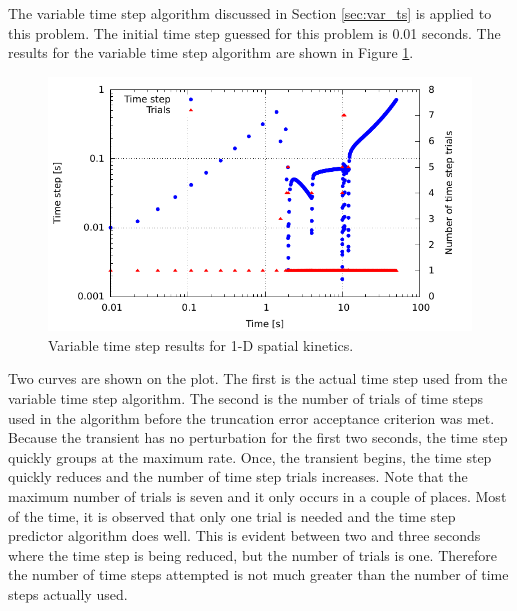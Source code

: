 \documentclass{ansconf}
\numberwithin{equation}{section}
\begin{document}
The variable time step algorithm discussed in Section \ref{sec:var_ts} is applied to this problem. The initial time step guessed for this problem is 0.01 seconds. The results for the variable time step algorithm are shown in Figure \ref{fig:1D_time}. 
\begin{figure}
\centering \includegraphics[scale=1.00]{./figs/1D_time.pdf}
\caption{Variable time step results for 1-D spatial kinetics.}
\label{fig:1D_time}
\end{figure}
Two curves are shown on the plot. The first is the actual time step used from the variable time step algorithm. The second is the number of trials of time steps used in the algorithm before the truncation error acceptance criterion was met. Because the transient has no perturbation for the first two seconds, the time step quickly groups at the maximum rate. Once, the transient begins, the time step quickly reduces and the number of time step trials increases.  Note that the maximum number of trials is seven and it only occurs in a couple of places. Most of the time, it is observed that only one trial is needed and the time step predictor algorithm does well.  This is evident between two and three seconds where the time step is being reduced, but the number of trials is one. Therefore the number of time steps attempted is not much greater than the number of time steps actually used.  

\label{sec:2D}
\end{document}

